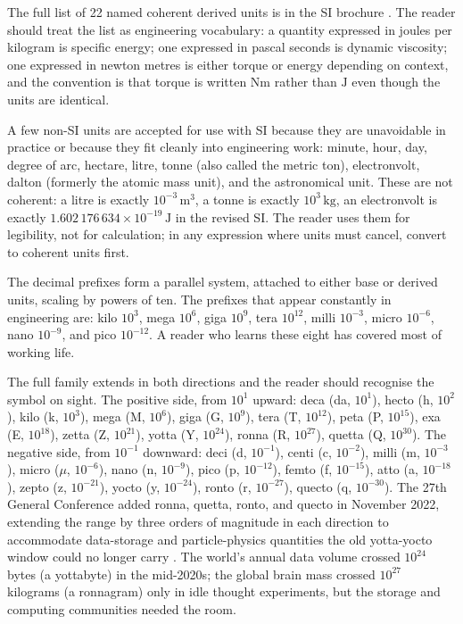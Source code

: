The full list of 22 named coherent derived units is in the SI
brochure \cite[ch.~3]{std:bipm-si2019}. The reader should treat the
list as engineering vocabulary: a quantity expressed in joules per
kilogram is specific energy; one expressed in pascal seconds is
dynamic viscosity; one expressed in newton metres is either torque or
energy depending on context, and the convention is that torque is
written $\si{\newton\meter}$ rather than $\si{\joule}$ even though
the units are identical.

A few non-SI units are accepted for use with SI because they are
unavoidable in practice or because they fit cleanly into engineering
work: minute, hour, day, degree of arc, hectare, litre, tonne (also
called the metric ton), electronvolt, dalton (formerly the atomic
mass unit), and the astronomical unit. These are not coherent: a
litre is exactly $10^{-3} \,\si{\meter\cubed}$, a tonne is exactly
$10^{3} \,\si{\kilogram}$, an electronvolt is exactly
$1.602\,176\,634 \times 10^{-19} \,\si{\joule}$ in the revised SI.
The reader uses them for legibility, not for calculation; in any
expression where units must cancel, convert to coherent units first.

The decimal prefixes form a parallel system, attached to either base
or derived units, scaling by powers of ten. The prefixes that appear
constantly in engineering are: kilo $10^{3}$, mega $10^{6}$, giga
$10^{9}$, tera $10^{12}$, milli $10^{-3}$, micro $10^{-6}$, nano
$10^{-9}$, and pico $10^{-12}$. A reader who learns these eight has
covered most of working life.

The full family extends in both directions and the reader should
recognise the symbol on sight. The positive side, from $10^{1}$
upward: deca (da, $10^{1}$), hecto (h, $10^{2}$), kilo (k, $10^{3}$),
mega (M, $10^{6}$), giga (G, $10^{9}$), tera (T, $10^{12}$), peta
(P, $10^{15}$), exa (E, $10^{18}$), zetta (Z, $10^{21}$), yotta
(Y, $10^{24}$), ronna (R, $10^{27}$), quetta (Q, $10^{30}$). The
negative side, from $10^{-1}$ downward: deci (d, $10^{-1}$), centi
(c, $10^{-2}$), milli (m, $10^{-3}$), micro ($\mu$, $10^{-6}$),
nano (n, $10^{-9}$), pico (p, $10^{-12}$), femto (f, $10^{-15}$),
atto (a, $10^{-18}$), zepto (z, $10^{-21}$), yocto (y, $10^{-24}$),
ronto (r, $10^{-27}$), quecto (q, $10^{-30}$). The 27th General
Conference added ronna, quetta, ronto, and quecto in November 2022,
extending the range by three orders of magnitude in each direction
to accommodate data-storage and particle-physics quantities the
old yotta-yocto window could no longer carry
\cite{web:ch02t3b-bipm-ronna-quetta-2022}. The world's annual
data volume crossed $10^{24}$ bytes (a yottabyte) in the mid-2020s;
the global brain mass crossed $10^{27}$ kilograms (a ronnagram) only
in idle thought experiments, but the storage and computing communities
needed the room.

